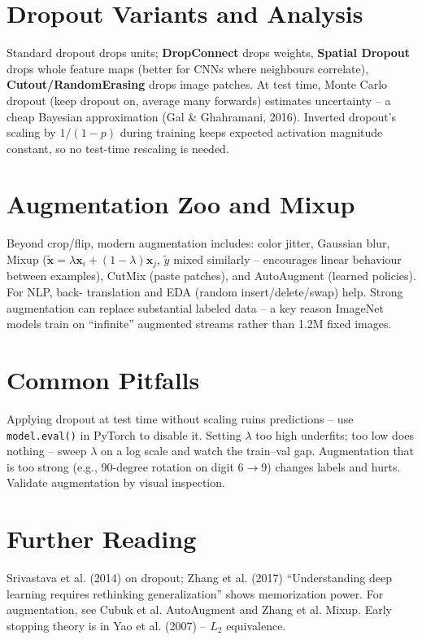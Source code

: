 \section{Dropout Variants and Analysis}
Standard dropout drops units; \textbf{DropConnect} drops weights, \textbf{Spatial
Dropout} drops whole feature maps (better for CNNs where neighbours correlate),
\textbf{Cutout/RandomErasing} drops image patches. At test time, Monte Carlo
dropout (keep dropout on, average many forwards) estimates uncertainty -- a
cheap Bayesian approximation (Gal \& Ghahramani, 2016). Inverted dropout's
scaling by $1/(1-p)$ during training keeps expected activation magnitude
constant, so no test-time rescaling is needed.

\section{Augmentation Zoo and Mixup}
Beyond crop/flip, modern augmentation includes: color jitter, Gaussian blur,
Mixup ($\tilde{\mathbf{x}}=\lambda\mathbf{x}_i+(1-\lambda)\mathbf{x}_j$,
$\tilde y$ mixed similarly -- encourages linear behaviour between examples),
CutMix (paste patches), and AutoAugment (learned policies). For NLP, back-
translation and EDA (random insert/delete/swap) help. Strong augmentation can
replace substantial labeled data -- a key reason ImageNet models train on
``infinite'' augmented streams rather than 1.2M fixed images.

\section{Common Pitfalls}
Applying dropout at test time without scaling ruins predictions -- use
\texttt{model.eval()} in PyTorch to disable it. Setting $\lambda$ too high
underfits; too low does nothing -- sweep $\lambda$ on a log scale and watch
the train--val gap. Augmentation that is too strong (e.g., 90-degree rotation
on digit 6$\to$9) changes labels and hurts. Validate augmentation by visual
inspection.

\section{Further Reading}
Srivastava et al. (2014) on dropout; Zhang et al. (2017) ``Understanding deep
learning requires rethinking generalization'' shows memorization power. For
augmentation, see Cubuk et al. AutoAugment and Zhang et al. Mixup. Early
stopping theory is in Yao et al. (2007) -- $L_2$ equivalence.

